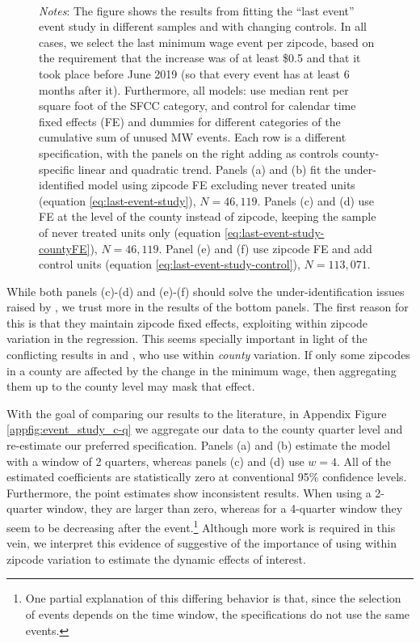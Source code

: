 \begin{figure}[h!]
\begin{subfigure}{0.5\textwidth}
        \end{subfigure}\\
        \begin{minipage}{.95\textwidth} \footnotesize
			\vspace{2mm} 
			\textit{Notes}: The figure shows the results from fitting the ``last event'' event study in different samples and with changing controls. In all cases, we select the last minimum wage event per zipcode, based on the requirement that the increase was of at least \$0.5 and that it took place before June 2019 (so that every event has at least 6 months after it). Furthermore, all models: use median rent per square foot of the SFCC category, and control for calendar time fixed effects (FE) and dummies for different categories of the cumulative sum of unused MW events. Each row is a different specification, with the panels on the right adding as controls county-specific linear and quadratic trend. Panels (a) and (b) fit the under-identified model using zipcode FE excluding never treated units (equation \ref{eq:last-event-study}), $N = 46,119$. Panels (c) and (d) use FE at the level of the county instead of zipcode, keeping the sample of never treated units only (equation \ref{eq:last-event-study-countyFE}), $N = 46,119$. Panel (e) and (f) use zipcode FE and add control units (equation \ref{eq:last-event-study-control}), $N = 113,071$.
		\end{minipage}
    \end{figure}
    
    While both panels (c)-(d) and (e)-(f) should solve the under-identification issues raised by \textcite{BorusyakJaravel2017}, we trust more in the results of the bottom panels. The first reason for this is that they maintain zipcode fixed effects, exploiting within zipcode variation in the regression. This seems specially important in light of the conflicting results in \textcite{tidemann2018mw} and \textcite{yamagishi2019minimum}, who use within \textit{county} variation. If only some zipcodes in a county are affected by the change in the minimum wage, then aggregating them up to the county level may mask that effect. 
    
    With the goal of comparing our results to the literature, in Appendix Figure \ref{appfig:event_study_c-q} we aggregate our data to the county quarter level and re-estimate our preferred specification. Panels (a) and (b) estimate the model with a window of 2 quarters, whereas panels (c) and (d) use $w = 4$. All of the estimated coefficients are statistically zero at conventional 95\% confidence levels. Furthermore, the point estimates show inconsistent results. When using a 2-quarter window, they are larger than zero, whereas for a 4-quarter window they seem to be decreasing after the event.\footnote{One partial explanation of this differing behavior is that, since the selection of events depends on the time window, the specifications do not use the same events.} Although more work is required in this vein, we interpret this evidence of suggestive of the importance of using within zipcode variation to estimate the dynamic effects of interest.
    
